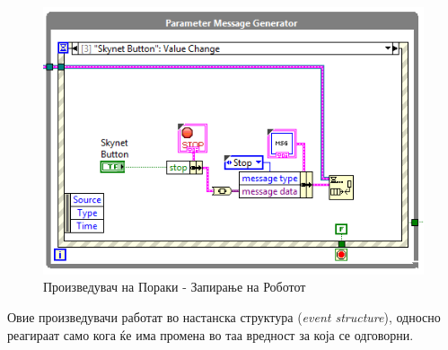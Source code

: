 \documentclass[12pt]{article}
\begin{document}
      \begin{figure}[H]
          \centering
          \includegraphics[width=0.75\linewidth]{./images/robot_stop_generator.png}
          \caption{Произведувач на Пораки - Запирање на Роботот}
          \end{figure}
      Овие произведувачи работат во настанска структура (\textit{event structure}), односно реагираат само кога ќе има промена во таа вредност за која се одговорни.
\end{document}
